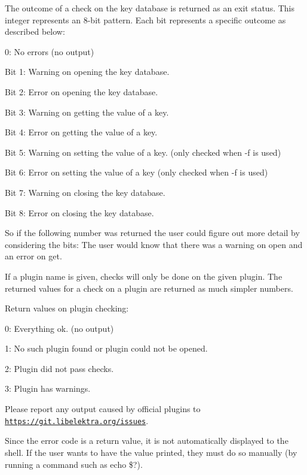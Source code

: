 The outcome of a check on the key database is returned as an exit status. This integer represents an 8-\/bit pattern. Each bit represents a specific outcome as described below\+:


\begin{DoxyItemize}
\item 0\+: No errors (no output)
\item Bit 1\+: Warning on opening the key database.
\item Bit 2\+: Error on opening the key database.
\item Bit 3\+: Warning on getting the value of a key.
\item Bit 4\+: Error on getting the value of a key.
\item Bit 5\+: Warning on setting the value of a key. (only checked when {\ttfamily -\/f} is used)
\item Bit 6\+: Error on setting the value of a key (only checked when {\ttfamily -\/f} is used)
\item Bit 7\+: Warning on closing the key database.
\item Bit 8\+: Error on closing the key database.
\end{DoxyItemize}

So if the following number was returned {} the user could figure out more detail by considering the bits\+: {} The user would know that there was a warning on open and an error on get.

If a plugin name is given, checks will only be done on the given plugin. The returned values for a check on a plugin are returned as much simpler numbers.

Return values on plugin checking\+:


\begin{DoxyItemize}
\item 0\+: Everything ok. (no output)
\item 1\+: No such plugin found or plugin could not be opened.
\item 2\+: Plugin did not pass checks.
\item 3\+: Plugin has warnings.
\end{DoxyItemize}

Please report any output caused by official plugins to \href{https://git.libelektra.org/issues}{\tt https\+://git.\+libelektra.\+org/issues}.

Since the error code is a return value, it is not automatically displayed to the shell. If the user wants to have the value printed, they must do so manually (by running a command such as {\ttfamily echo \$?}).

